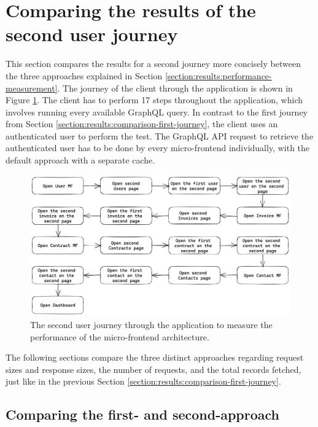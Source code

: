 \section{Comparing the results of the second user journey}\label{section:results:comparison-second-journey}

This section compares the results for a second journey more concisely between the three approaches explained in Section \ref{section:results:performance-measurement}. The journey of the client through the application is shown in Figure \ref{fig:results:evaluation-second-path}. The client has to perform 17 steps throughout the application, which involves running every available GraphQL query. In contrast to the first journey from Section \ref{section:results:comparison-first-journey}, the client uses an authenticated user to perform the test. The GraphQL \ac{API} request to retrieve the authenticated user has to be done by every micro-frontend individually, with the default approach with a separate cache.

\ifshowImages
\begin{figure}[H]
\centering
\includegraphics[width=1\linewidth]{images/results/evaluation-second-path.png}
\caption{The second user journey through the application to measure the performance of the micro-frontend architecture.}\label{fig:results:evaluation-second-path}
\end{figure}
\fi

\noindent The following sections compare the three distinct approaches regarding request sizes and response sizes, the number of requests, and the total records fetched, just like in the previous Section \ref{section:results:comparison-first-journey}.

\subsection{Comparing the first- and second-approach}\label{subsection:results:comparison-second-path-first-second-approach}

